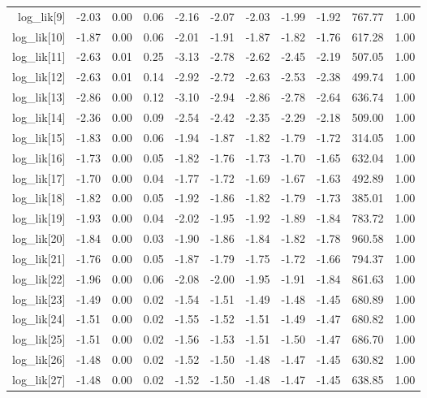 \begin{table}[ht]
\begin{tabular}{rrrrrrrrrrr}
  log\_lik[9] & -2.03 & 0.00 & 0.06 & -2.16 & -2.07 & -2.03 & -1.99 & -1.92 & 767.77 & 1.00 \\ 
  log\_lik[10] & -1.87 & 0.00 & 0.06 & -2.01 & -1.91 & -1.87 & -1.82 & -1.76 & 617.28 & 1.00 \\ 
  log\_lik[11] & -2.63 & 0.01 & 0.25 & -3.13 & -2.78 & -2.62 & -2.45 & -2.19 & 507.05 & 1.00 \\ 
  log\_lik[12] & -2.63 & 0.01 & 0.14 & -2.92 & -2.72 & -2.63 & -2.53 & -2.38 & 499.74 & 1.00 \\ 
  log\_lik[13] & -2.86 & 0.00 & 0.12 & -3.10 & -2.94 & -2.86 & -2.78 & -2.64 & 636.74 & 1.00 \\ 
  log\_lik[14] & -2.36 & 0.00 & 0.09 & -2.54 & -2.42 & -2.35 & -2.29 & -2.18 & 509.00 & 1.00 \\ 
  log\_lik[15] & -1.83 & 0.00 & 0.06 & -1.94 & -1.87 & -1.82 & -1.79 & -1.72 & 314.05 & 1.00 \\ 
  log\_lik[16] & -1.73 & 0.00 & 0.05 & -1.82 & -1.76 & -1.73 & -1.70 & -1.65 & 632.04 & 1.00 \\ 
  log\_lik[17] & -1.70 & 0.00 & 0.04 & -1.77 & -1.72 & -1.69 & -1.67 & -1.63 & 492.89 & 1.00 \\ 
  log\_lik[18] & -1.82 & 0.00 & 0.05 & -1.92 & -1.86 & -1.82 & -1.79 & -1.73 & 385.01 & 1.00 \\ 
  log\_lik[19] & -1.93 & 0.00 & 0.04 & -2.02 & -1.95 & -1.92 & -1.89 & -1.84 & 783.72 & 1.00 \\ 
  log\_lik[20] & -1.84 & 0.00 & 0.03 & -1.90 & -1.86 & -1.84 & -1.82 & -1.78 & 960.58 & 1.00 \\ 
  log\_lik[21] & -1.76 & 0.00 & 0.05 & -1.87 & -1.79 & -1.75 & -1.72 & -1.66 & 794.37 & 1.00 \\ 
  log\_lik[22] & -1.96 & 0.00 & 0.06 & -2.08 & -2.00 & -1.95 & -1.91 & -1.84 & 861.63 & 1.00 \\ 
  log\_lik[23] & -1.49 & 0.00 & 0.02 & -1.54 & -1.51 & -1.49 & -1.48 & -1.45 & 680.89 & 1.00 \\ 
  log\_lik[24] & -1.51 & 0.00 & 0.02 & -1.55 & -1.52 & -1.51 & -1.49 & -1.47 & 680.82 & 1.00 \\ 
  log\_lik[25] & -1.51 & 0.00 & 0.02 & -1.56 & -1.53 & -1.51 & -1.50 & -1.47 & 686.70 & 1.00 \\ 
  log\_lik[26] & -1.48 & 0.00 & 0.02 & -1.52 & -1.50 & -1.48 & -1.47 & -1.45 & 630.82 & 1.00 \\ 
  log\_lik[27] & -1.48 & 0.00 & 0.02 & -1.52 & -1.50 & -1.48 & -1.47 & -1.45 & 638.85 & 1.00 \\ 

\end{tabular}
\end{table}
